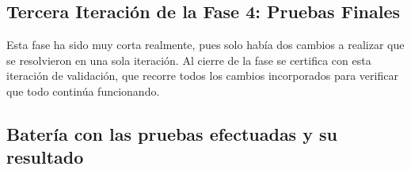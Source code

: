 \subsection{Tercera Iteración de la Fase 4: Pruebas Finales}
\label{sec:PruebasFase4}

Esta fase ha sido muy corta realmente, pues solo había dos cambios a realizar que se resolvieron en una sola iteración. Al cierre de la fase se certifica con esta iteración de validación, que recorre todos los cambios incorporados para verificar que todo continúa funcionando. 

\subsection{Batería con las pruebas efectuadas y su resultado}
\label{sec:BateriaPruebasFase4}


